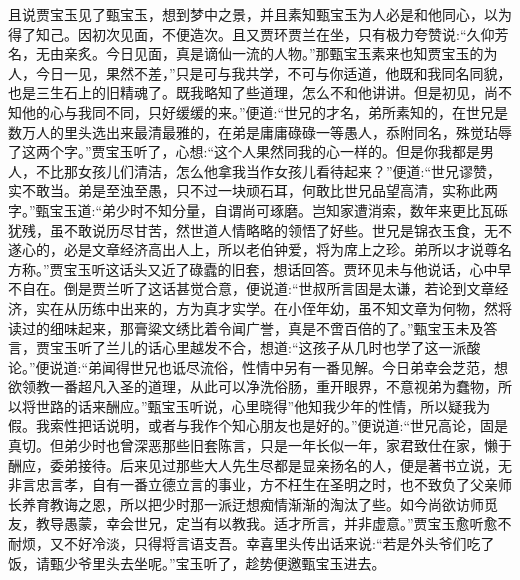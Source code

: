 \begin{parag}
    且说贾宝玉见了甄宝玉，想到梦中之景，并且素知甄宝玉为人必是和他同心，以为得了知己。因初次见面，不便造次。且又贾环贾兰在坐，只有极力夸赞说:“久仰芳名，无由亲炙。今日见面，真是谪仙一流的人物。”那甄宝玉素来也知贾宝玉的为人，今日一见，果然不差，”只是可与我共学，不可与你适道，他既和我同名同貌，也是三生石上的旧精魂了。既我略知了些道理，怎么不和他讲讲。但是初见，尚不知他的心与我同不同，只好缓缓的来。”便道:“世兄的才名，弟所素知的，在世兄是数万人的里头选出来最清最雅的，在弟是庸庸碌碌一等愚人，忝附同名，殊觉玷辱了这两个字。”贾宝玉听了，心想:“这个人果然同我的心一样的。但是你我都是男人，不比那女孩儿们清洁，怎么他拿我当作女孩儿看待起来？”便道:“世兄谬赞，实不敢当。弟是至浊至愚，只不过一块顽石耳，何敢比世兄品望高清，实称此两字。”甄宝玉道:“弟少时不知分量，自谓尚可琢磨。岂知家遭消索，数年来更比瓦砾犹残，虽不敢说历尽甘苦，然世道人情略略的领悟了好些。世兄是锦衣玉食，无不遂心的，必是文章经济高出人上，所以老伯钟爱，将为席上之珍。弟所以才说尊名方称。”贾宝玉听这话头又近了碌蠹的旧套，想话回答。贾环见未与他说话，心中早不自在。倒是贾兰听了这话甚觉合意，便说道:“世叔所言固是太谦，若论到文章经济，实在从历练中出来的，方为真才实学。在小侄年幼，虽不知文章为何物，然将读过的细味起来，那膏粱文绣比着令闻广誉，真是不啻百倍的了。”甄宝玉未及答言，贾宝玉听了兰儿的话心里越发不合，想道:“这孩子从几时也学了这一派酸论。”便说道:“弟闻得世兄也诋尽流俗，性情中另有一番见解。今日弟幸会芝范，想欲领教一番超凡入圣的道理，从此可以净洗俗肠，重开眼界，不意视弟为蠢物，所以将世路的话来酬应。”甄宝玉听说，心里晓得”他知我少年的性情，所以疑我为假。我索性把话说明，或者与我作个知心朋友也是好的。”便说道:“世兄高论，固是真切。但弟少时也曾深恶那些旧套陈言，只是一年长似一年，家君致仕在家，懒于酬应，委弟接待。后来见过那些大人先生尽都是显亲扬名的人，便是著书立说，无非言忠言孝，自有一番立德立言的事业，方不枉生在圣明之时，也不致负了父亲师长养育教诲之恩，所以把少时那一派迂想痴情渐渐的淘汰了些。如今尚欲访师觅友，教导愚蒙，幸会世兄，定当有以教我。适才所言，并非虚意。”贾宝玉愈听愈不耐烦，又不好冷淡，只得将言语支吾。幸喜里头传出话来说:“若是外头爷们吃了饭，请甄少爷里头去坐呢。”宝玉听了，趁势便邀甄宝玉进去。
\end{parag}


